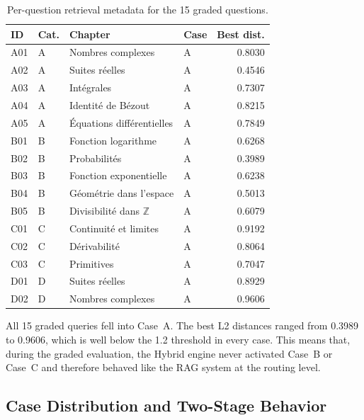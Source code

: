 \begin{table}[H]
\centering
\caption{Per-question retrieval metadata for the 15 graded questions. }
\label{tab:per-question-retrieval}
\begin{tabular}{llllr}
\small
\toprule
\textbf{ID} & \textbf{Cat.} & \textbf{Chapter} & \textbf{Case} & \textbf{Best dist.} \\
\midrule
A01 & A & Nombres complexes         & A & 0.8030 \\
A02 & A & Suites réelles            & A & 0.4546 \\
A03 & A & Intégrales                & A & 0.7307 \\
A04 & A & Identité de Bézout        & A & 0.8215 \\
A05 & A & Équations différentielles & A & 0.7849 \\
\midrule
B01 & B & Fonction logarithme       & A & 0.6268 \\
B02 & B & Probabilités              & A & 0.3989 \\
B03 & B & Fonction exponentielle    & A & 0.6238 \\
B04 & B & Géométrie dans l'espace   & A & 0.5013 \\
B05 & B & Divisibilité dans $\mathbb{Z}$ & A & 0.6079 \\
\midrule
C01 & C & Continuité et limites     & A & 0.9192 \\
C02 & C & Dérivabilité              & A & 0.8064 \\
C03 & C & Primitives                & A & 0.7047 \\
\midrule
D01 & D & Suites réelles            & A & 0.8929 \\
D02 & D & Nombres complexes         & A & 0.9606 \\
\bottomrule
\end{tabular}
\end{table}

All 15 graded queries fell into Case~A. The best L2 distances ranged from
0.3989 to 0.9606, which is well below the 1.2 threshold in every case. This
means that, during the graded evaluation, the Hybrid engine never activated
Case~B or Case~C and therefore behaved like the RAG system at the routing
level.

\subsection{Case Distribution and Two-Stage Behavior}
\label{subsec:retrieval-routing-analysis}

